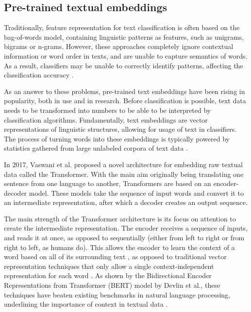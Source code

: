 \subsection{Pre-trained textual embeddings}
Traditionally, feature representation for text classification is often based on the bag-of-words model, containing linguistic patterns as features, such as unigrams, bigrams or n-grams.
However, these approaches completely ignore contextual information or word order in texts, and are unable to capture semantics of words. 
As a result, classifiers may be unable to correctly identify patterns, affecting the classification accuracy \cite{lai2015}.

As an answer to these problems, pre-trained text embeddings have been rising in popularity, both in use and in research.
Before classification is possible, text data needs to be transformed into numbers to be able to be interpreted by classification algorithms.
Fundamentally, text embeddings are vector representations of linguistic structures, allowing for usage of text in classifiers. 
The process of turning words into these embeddings is typically powered by statistics gathered from large unlabeled corpora of text data \cite{mikolov2017}.

In 2017, Vaswani et al. proposed a novel architecture for embedding raw textual data called the Transformer. 
With the main aim originally being translating one sentence from one language to another, Transformers are based on an encoder-decoder model.
These models take the sequence of input words and convert it to an intermediate representation, after which a decoder creates an output sequence.

The main strength of the Transformer architecture is its focus on attention to create the intermediate representation.
The encoder receives a sequence of inputs, and reads it at once, as opposed to sequentially (either from left to right or from right to left, as humans do). 
This allows the encoder to learn the context of a word based on all of its surrounding text \cite{vaswani2017}, as opposed to traditional vector representation techniques that only allow a single context-independent representation for each word \cite{peters2018}.
As shown by the Bidirectional Encoder Representations from Transformer (BERT) model by Devlin et al., these techniques have beaten existing benchmarks in natural language processing, underlining the importance of context in textual data \cite{devlin2018}.

